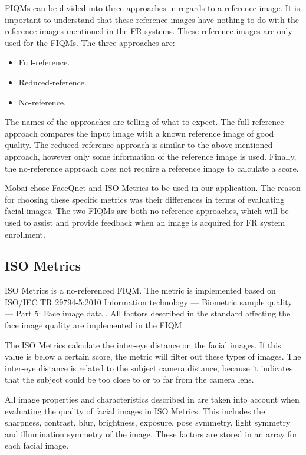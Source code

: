 FIQMs can be divided into three approaches in regards to a reference image. It is important to understand that these reference images have nothing to do with the reference images mentioned in the FR systems. These reference images are only used for the FIQMs. The three approaches are: 
%
\begin{itemize}
    \item Full-reference.
    \item Reduced-reference.
    \item No-reference. 
\end{itemize}
%
The names of the approaches are telling of what to expect. The full-reference approach compares the input image with a known reference image of good quality. The reduced-reference approach is similar to the above-mentioned approach, however only some information of the reference image is used. Finally, the no-reference approach does not require a reference image to calculate a score. 

Mobai chose FaceQnet and ISO Metrics to be used in our application. The reason for choosing these specific metrics was their differences in terms of evaluating facial images. The two FIQMs are both no-reference approaches, which will be used to assist and provide feedback when an image is acquired for FR system enrollment. 


\subsection{ISO Metrics}
ISO Metrics is a no-referenced FIQM. The metric is implemented based on ISO/IEC TR 29794-5:2010 Information technology — Biometric sample quality — Part 5: Face image data \cite{ISO50912}. All factors described in the standard affecting the face image quality are implemented in the FIQM. 

The ISO Metrics calculate the inter-eye distance on the facial images. If this value is below a certain score, the metric will filter out these types of images. The inter-eye distance is related to the subject camera distance, because it indicates that the subject could be too close to or to far from the camera lens. 

All image properties and characteristics described in \cite{ISO50912} are taken into account when evaluating the quality of facial images in ISO Metrics. This includes the sharpness, contrast, blur, brightness, exposure, pose symmetry, light symmetry and illumination symmetry of the image. These factors are stored in an array for each facial image. 


